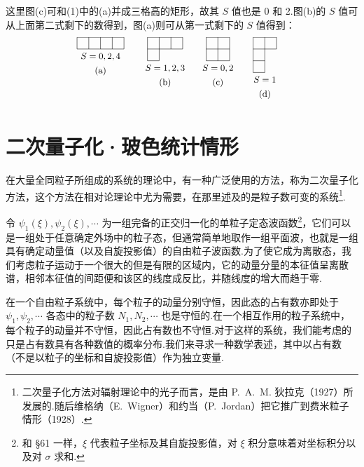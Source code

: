 \begin{xiti}
这里图(c)可和(1)中的(a)并成三格高的矩形，故其 $S$ 值也是 0 和 2.图(b)的 $S$ 值可从上面第二式剩下的数得到，图(a)则可从第一式剩下的 $S$ 值得到：
\begin{equation*}
  \setlength{\unitlength}{1pt}%
  \begin{picture}(230,64)
    \yh{8}{52}{48}\yh{8}{64}{48}\yv{8}{52}{12}\yv{20}{52}{12}\yv{32}{52}{12}\yv{44}{52}{12}\yv{56}{52}{12}%
    \ytl{32}{48}{$S=0,2,4$}\ytl{32}{34}{(a)}%
    \yh{80}{40}{12}\yh{80}{52}{36}\yh{80}{64}{36}\yv{80}{40}{24}\yv{92}{40}{24}\yv{104}{52}{12}\yv{116}{52}{12}%
    \ytl{98}{36}{$S=1,2,3$}\ytl{98}{22}{(b)}%
    \yh{140}{40}{24}\yh{140}{52}{24}\yh{140}{64}{24}\yv{140}{40}{24}\yv{152}{40}{24}\yv{164}{40}{24}%
    \ytl{152}{36}{$S=0,2$}\ytl{152}{22}{(c)}%
    \yh{188}{28}{12}\yh{188}{40}{12}\yh{188}{52}{24}\yh{188}{64}{24}\yv{188}{28}{36}\yv{200}{28}{36}\yv{212}{52}{12}%
    \ytl{200}{24}{$S=1$}\ytl{200}{10}{(d)}%
  \end{picture}
\end{equation*}

\end{xiti}
\setcounter{equation}{0}%

\section{二次量子化·玻色统计情形}

在大量全同粒子所组成的系统的理论中，有一种广泛使用的方法，称为二次量子化方法，这个方法在相对论理论中尤为需要，在那里述及的是粒子数可变的系统\footnote{二次量子化方法对辐射理论中的光子而言，是由 P.~A.~M. 狄拉克（1927）所发展的.随后维格纳（E.~Wigner）和约当（P.~Jordan）把它推广到费米粒子情形（1928）.}.

令 $\psi_1(\xi),\psi_2(\xi),\cdots$ 为一组完备的正交归一化的单粒子定态波函数\footnote{和 §61 一样，$\xi$ 代表粒子坐标及其自旋投影值，对 $\xi$ 积分意味着对坐标积分以及对 $\sigma$ 求和.}，它们可以是一组处于任意确定外场中的粒子态，但通常简单地取作一组平面波，也就是一组具有确定动量值（以及自旋投影值）的自由粒子波函数.为了使它成为离散态，我们考虑粒子运动于一个很大的但是有限的区域内，它的动量分量的本征值呈离散谱，相邻本征值的间距便和该区的线度成反比，并随线度的增大而趋于零.

在一个自由粒子系统中，每个粒子的动量分别守恒，因此态的占有数亦即处于 $\psi_1,\psi_2,\cdots$ 各态中的粒子数 $N_1,N_2,\cdots$ 也是守恒的.在一个相互作用的粒子系统中，每个粒子的动量并不守恒，因此占有数也不守恒.对于这样的系统，我们能考虑的只是占有数具有各种数值的概率分布.我们来寻求一种数学表述，其中以占有数（不是以粒子的坐标和自旋投影值）作为独立变量.

